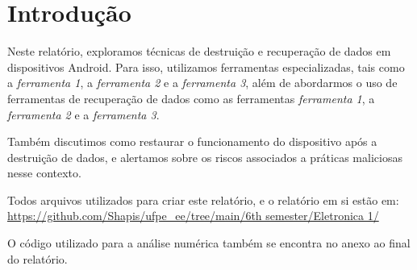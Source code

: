 \section{Introdução}

Neste relatório, exploramos técnicas de destruição e recuperação de dados em dispositivos Android. Para isso, utilizamos ferramentas especializadas, tais como a \emph{ferramenta 1}, a \emph{ferramenta 2} e a \emph{ferramenta 3}, além de abordarmos o uso de ferramentas de recuperação de dados como as ferramentas \emph{ferramenta 1}, a \emph{ferramenta 2} e a \emph{ferramenta 3}.

Também discutimos como restaurar o funcionamento do dispositivo após a destruição de dados, e alertamos sobre os riscos associados a práticas maliciosas nesse contexto.

Todos arquivos utilizados para criar este relatório, e o relatório em si estão em:  \url{https://github.com/Shapis/ufpe_ee/tree/main/6th semester/Eletronica 1/}

O código utilizado para a análise numérica também se encontra no anexo ao final do relatório.